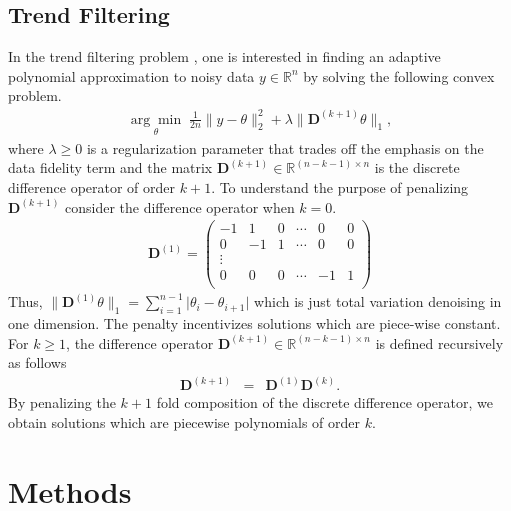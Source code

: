 \documentclass[12pt]{article}
\begin{document}
	\subsection{Trend Filtering}
	
	In the trend filtering problem \citep{Kim2009, Tib2014}, one is interested in finding an adaptive polynomial approximation to noisy data $y \in \mathbb{R}^n$ by solving the following convex problem.
	\begin{eqnarray}
		\underset{\theta}{\arg\min}\; \frac{1}{2n} \lVert y - \theta \rVert_2^2 + \lambda \lVert \mathbf{D}^{(k+1)}\theta \rVert_1,
	\end{eqnarray}
	where $\lambda \geq 0$ is a regularization parameter that trades off the emphasis on the data fidelity term and the matrix $\mathbf{D}^{(k+1)} \in \mathbb{R}^{(n - k -1) \times n}$ is the discrete difference operator of order $k+1$. To understand the purpose of penalizing $\mathbf{D}^{(k+1)}$ consider the difference operator when $k = 0$.
	\begin{eqnarray}
		\mathbf{D}^{(1)} = \begin{pmatrix}
			-1 & 1 & 0 & \cdots & 0 & 0 \\
			0 & -1 & 1 & \cdots & 0 & 0 \\
			\vdots & & & & & \\
			0 & 0 & 0 & \cdots & -1 & 1 \\
		\end{pmatrix}
	\end{eqnarray}
	Thus, $\lVert \mathbf{D}^{(1)}\theta \rVert_1 = \sum_{i=1}^{n-1} \lvert \theta_i - \theta_{i+1} \rvert$ which is just total variation denoising in one dimension. The penalty incentivizes solutions which are piece-wise constant. For $k \geq 1$, the difference operator $\mathbf{D}^{(k+1)} \in \mathbb{R}^{(n-k-1) \times n}$ is defined recursively as follows
	\begin{eqnarray}
		\mathbf{D}^{(k+1)} & = & \mathbf{D}^{(1)}\mathbf{D}^{(k)}.
	\end{eqnarray}
	By penalizing the $k+1$ fold composition of the discrete difference operator, we obtain solutions which are piecewise polynomials of order $k$.
	
	\section{Methods}
	
\end{document}
